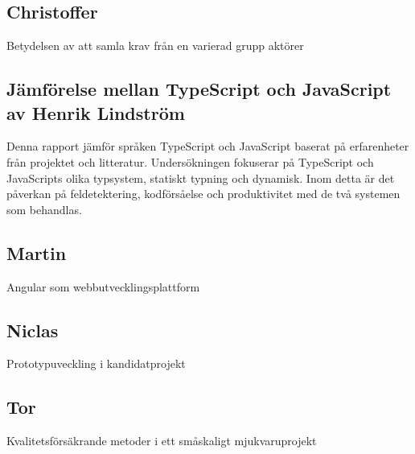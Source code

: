 \subsection{Christoffer}
Betydelsen av att samla krav från en varierad grupp aktörer
\subsection{Jämförelse mellan TypeScript och JavaScript av Henrik Lindström}
Denna rapport jämför språken TypeScript och JavaScript baserat på erfarenheter från projektet och litteratur. Undersökningen fokuserar på TypeScript och JavaScripts olika typsystem, statiskt typning och dynamisk. Inom detta är det påverkan på feldetektering, kodförsåelse och produktivitet med de två systemen som behandlas.
\subsection{Martin}
Angular som webbutvecklingsplattform
\subsection{Niclas}
Prototypuveckling i kandidatprojekt
\subsection{Tor}
Kvalitetsförsäkrande metoder i ett småskaligt mjukvaruprojekt
